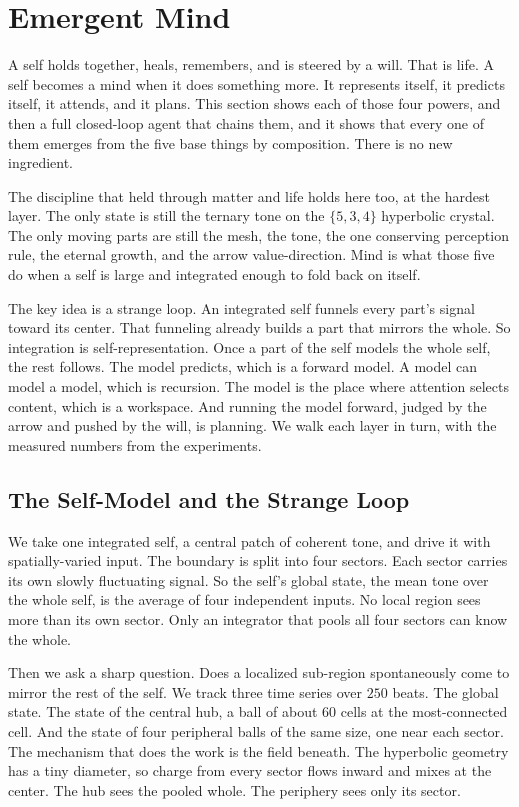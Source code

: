 \section{Emergent Mind}

A self holds together, heals, remembers, and is steered by a will. That is life. A self becomes a mind when it does something more. It represents itself, it predicts itself, it attends, and it plans. This section shows each of those four powers, and then a full closed-loop agent that chains them, and it shows that every one of them emerges from the five base things by composition. There is no new ingredient.

The discipline that held through matter and life holds here too, at the hardest layer. The only state is still the ternary tone on the $\{5,3,4\}$ hyperbolic crystal. The only moving parts are still the mesh, the tone, the one conserving perception rule, the eternal growth, and the arrow value-direction. Mind is what those five do when a self is large and integrated enough to fold back on itself.

The key idea is a strange loop. An integrated self funnels every part's signal toward its center. That funneling already builds a part that mirrors the whole. So integration is self-representation. Once a part of the self models the whole self, the rest follows. The model predicts, which is a forward model. A model can model a model, which is recursion. The model is the place where attention selects content, which is a workspace. And running the model forward, judged by the arrow and pushed by the will, is planning. We walk each layer in turn, with the measured numbers from the experiments.

\subsection{The Self-Model and the Strange Loop}

We take one integrated self, a central patch of coherent tone, and drive it with spatially-varied input. The boundary is split into four sectors. Each sector carries its own slowly fluctuating signal. So the self's global state, the mean tone over the whole self, is the average of four independent inputs. No local region sees more than its own sector. Only an integrator that pools all four sectors can know the whole.

Then we ask a sharp question. Does a localized sub-region spontaneously come to mirror the rest of the self. We track three time series over $250$ beats. The global state. The state of the central hub, a ball of about $60$ cells at the most-connected cell. And the state of four peripheral balls of the same size, one near each sector. The mechanism that does the work is the field beneath. The hyperbolic geometry has a tiny diameter, so charge from every sector flows inward and mixes at the center. The hub sees the pooled whole. The periphery sees only its sector.


